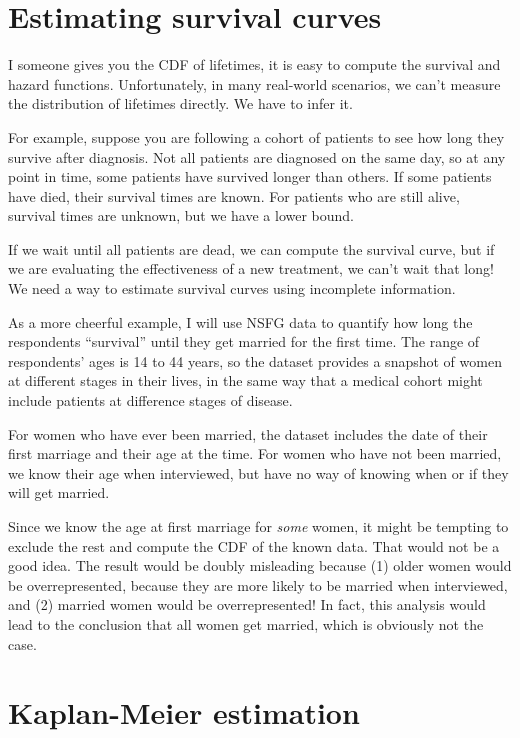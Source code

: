 \documentclass[12pt]{book}
\begin{document}
\section{Estimating survival curves}

I someone gives you the CDF of lifetimes, it is easy to compute the
survival and hazard functions.  Unfortunately, in many real-world
scenarios, we can't measure the distribution of lifetimes directly.
We have to infer it.

For example, suppose you are following a cohort of patients to see how
long they survive after diagnosis.  Not all patients are diagnosed
on the same day, so at any point in time, some patients have survived
longer than others.  If some patients have died, their survival times
are known.  For patients who are still alive, survival times are
unknown, but we have a lower bound.

If we wait until all patients are dead, we can compute the survival
curve, but if we are evaluating the effectiveness of a new treatment,
we can't wait that long!  We need a way to estimate survival curves
using incomplete information.

As a more cheerful example, I will use NSFG data to quantify how
long the respondents ``survival'' until they get married for the
first time.  The range of respondents' ages is 14 to 44 years, so
the dataset provides a snapshot of women at different stages in their
lives, in the same way that a medical cohort might include patients
at difference stages of disease.

For women who have ever been married, the dataset includes the date
of their first marriage and their age at the time.
For women who have not been married, we know their age when interviewed,
but have no way of knowing when or if they will get married.

Since we know the age at first marriage for {\em some} women, it
might be tempting to exclude the rest and compute the CDF of
the known data.  That would not be a good idea.  The result would
be doubly misleading because (1) older women would be overrepresented,
because they are more likely to be married when interviewed,
and (2) married women would be overrepresented!  In fact, this
analysis would lead to the conclusion that all women get married,
which is obviously not the case.

\section{Kaplan-Meier estimation}
\end{document}
